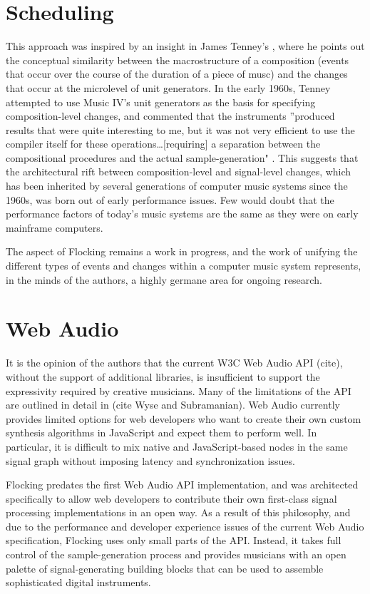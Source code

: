\documentclass{article}
\begin{document}
\section{Scheduling} \label{sec:Scheduling}

This approach was inspired by an insight in James Tenney's \cite{tenney1969computer}, where he points out the conceptual similarity between the macrostructure of a composition (events that occur over the course of the duration of a piece of musc) and the changes that occur at the microlevel of unit generators. In the early 1960s, Tenney attempted to use Music IV's unit generators as the basis for specifying composition-level changes, and commented that the instruments ''produced results that were quite interesting to me, but it was not very efficient to use the compiler itself for these operations\ldots [requiring] a separation between the compositional procedures and the actual sample-generation" \cite[p.41--42]{tenney1969computer}. This suggests that the architectural rift between composition-level and signal-level changes, which has been inherited by several generations of computer music systems since the 1960s, was born out of early performance issues. Few would doubt that the performance factors of today's music systems are the same as they were on early mainframe computers.


The aspect of Flocking remains a work in progress, and the work of unifying the different types of events and changes within a computer music system represents, in the minds of the authors, a highly germane area for ongoing research.

\section{Web Audio}

It is the opinion of the authors that the current W3C Web Audio API (cite), without the support of additional libraries, is insufficient to support the expressivity required by creative musicians. Many of the limitations of the API are outlined in detail in (cite Wyse and Subramanian). Web Audio currently provides limited options for web developers who want to create their own custom synthesis algorithms in JavaScript and expect them to perform well. In particular, it is difficult to mix native and JavaScript-based nodes in the same signal graph without imposing latency and synchronization issues.

Flocking predates the first Web Audio API implementation, and was architected specifically to allow web developers to contribute their own first-class signal processing implementations in an open way. As a result of this philosophy, and due to the performance and developer experience issues of the current Web Audio specification, Flocking uses only small parts of the API. Instead, it takes full control of the sample-generation process and provides musicians with an open palette of signal-generating building blocks that can be used to assemble sophisticated digital instruments.
\end{document}
